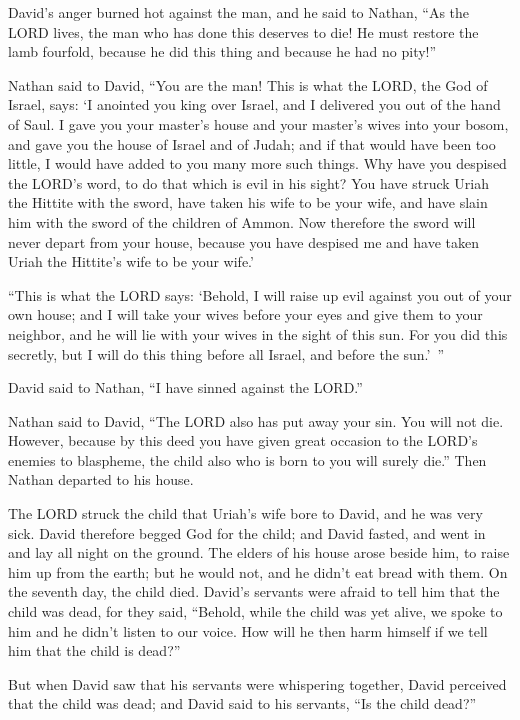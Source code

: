 \myverse{}David’s anger burned hot against the man, and he said to Nathan,
“As the LORD lives, the man who has done this deserves to die!
\myverse{}He must restore the lamb fourfold, because he did this thing and because he
had no pity!”

\myverse{}Nathan said to David, “You are the man! This is what the LORD,
the God of Israel, says: ‘I anointed you king over Israel, and I delivered you out of the hand of Saul.
\myverse{}I gave you your master’s house and your master’s wives into your bosom, and
gave you the house of Israel and of Judah; and if that would have been too little, I would have added
to you many more such things.
\myverse{}Why have you despised the LORD’s word, to do that which is evil in his sight?
You have struck Uriah the Hittite with the sword, have taken his wife to be your wife, and have slain
him with the sword of the children of Ammon.
\myverse{}Now therefore the sword will never depart from your house, because you have
despised me and have taken Uriah the Hittite’s wife to be your wife.’

\myverse{}“This is what the LORD says: ‘Behold, I will raise up evil against
you out of your own house; and I will take your wives before your eyes and give them to your neighbor,
and he will lie with your wives in the sight of this sun.
\myverse{}For you did this secretly, but I will do this thing before all Israel, and
before the sun.’ ”

\myverse{}David said to Nathan, “I have sinned against the LORD.”

Nathan said to David, “The LORD also has put away your sin. You will not die.
\myverse{}However, because by this deed you have given great occasion to the LORD’s
enemies to blaspheme, the child also who is born to you will surely die.”
\myverse{}Then Nathan departed to his house.

The LORD struck the child that Uriah’s wife bore to David, and he was very sick.
\myverse{}David therefore begged God for the child; and David fasted, and went in and
lay all night on the ground.
\myverse{}The elders of his house arose beside him, to raise him up from the earth;
but he would not, and he didn’t eat bread with them.
\myverse{}On the seventh day, the child died. David’s servants were afraid to tell
him that the child was dead, for they said, “Behold, while the child was yet alive, we spoke to him and
he didn’t listen to our voice. How will he then harm himself if we tell him that the child is dead?”

\myverse{}But when David saw that his servants were whispering together,
David perceived that the child was dead; and David said to his servants, “Is the child dead?”

